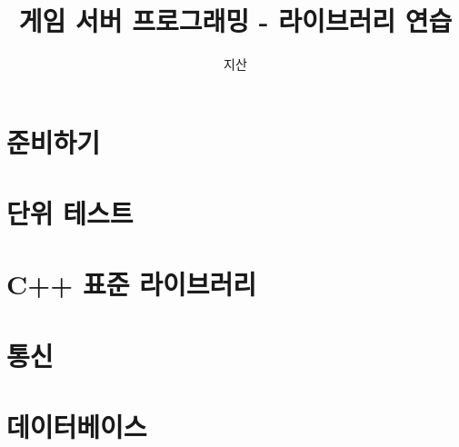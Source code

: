 \documentclass{book}
\begin{document}
\title{게임 서버 프로그래밍 - 라이브러리 연습}
\author{지산}
\maketitle
\tableofcontents

\part{준비하기}



\part{단위 테스트}

\part{C++ 표준 라이브러리}



\part{통신}

\part{데이터베이스}
\end{document}
